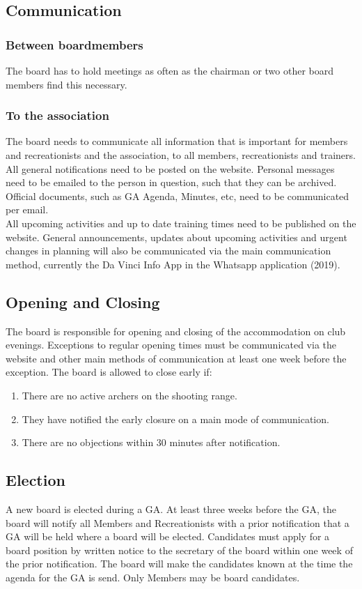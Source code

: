 \documentclass[a4paper]{article}
\begin{document}
\subsection{Communication}
\subsubsection{Between boardmembers}
The board has to hold meetings as often as the chairman or two other board members find this necessary.

\subsubsection{To the association}
The board needs to communicate all information that is important for members and recreationists and the association, to all members, recreationists and trainers. All general notifications need to be posted on the website. Personal messages need to be emailed to the person in question, such that they can be archived. Official documents, such as GA Agenda, Minutes, etc, need to be communicated per email. \\
 
All upcoming activities and up to date training times need to be published on the website. 
General announcements, updates about upcoming activities and urgent changes in planning will also be communicated via the main communication method, currently the Da Vinci Info App in the Whatsapp application {\g (2019)}.

\subsection{Opening and Closing}
The board is responsible for opening and closing of the accommodation on club evenings. Exceptions to regular opening times must be communicated via the website and other main methods of communication at least one week before the exception. The board is allowed to close early if:

\begin{enumerate}
\item There are no active archers on the shooting range.
\item They have notified the early closure on a main mode of communication.
\item There are no objections within 30 minutes after notification.
\end{enumerate}

\subsection{Election}
A new board is elected during a GA. At least three weeks before the GA, the board will notify all Members and Recreationists with a prior notification that a GA will be held where a board will be elected. Candidates must apply for a board position by written notice to the secretary of the board within one week of the prior notification. The board will make the candidates known at the time the agenda for the GA is send. Only Members may be board candidates. \\
\end{document}
